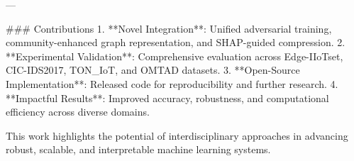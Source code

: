 ---

### Contributions  
1. **Novel Integration**: Unified adversarial training, community-enhanced graph representation, and SHAP-guided compression.  
2. **Experimental Validation**: Comprehensive evaluation across Edge-IIoTset, CIC-IDS2017, TON_IoT, and OMTAD datasets.  
3. **Open-Source Implementation**: Released code for reproducibility and further research.  
4. **Impactful Results**: Improved accuracy, robustness, and computational efficiency across diverse domains.  

This work highlights the potential of interdisciplinary approaches in advancing robust, scalable, and interpretable machine learning systems.